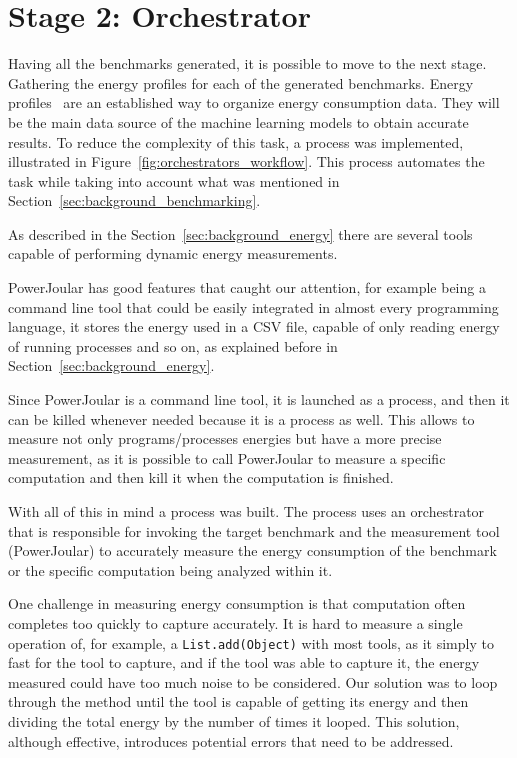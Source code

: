 

\section{Stage 2: Orchestrator} \label{sec:work_stage2_orchestrator}




Having all the benchmarks generated, it is possible to move to the next stage. Gathering the energy profiles for each of the generated benchmarks. 
Energy profiles~\cite{10.1145/2884781.2884869,8816747} are an established way to organize energy consumption data. They will be the main data source of the machine learning models to obtain accurate results. To reduce the complexity of this task, a process was implemented, illustrated in Figure~\ref{fig:orchestrators_workflow}. This process automates the task while taking into account what was mentioned in Section~\ref{sec:background_benchmarking}.

As described in the Section~\ref{sec:background_energy} there are several tools capable of performing dynamic energy measurements.

PowerJoular has good features that caught our attention, for example being a command line tool that could be easily integrated in almost every programming language, it stores the energy used in a CSV file, capable of only reading energy of running processes and so on, as explained before in Section~\ref{sec:background_energy}.

Since PowerJoular is a command line tool, it is launched as a process, and then it can be killed whenever needed because it is a process as well. This allows to measure not only programs/processes energies but have a more precise measurement, as it is possible to call PowerJoular to measure a specific computation and then kill it when the computation is finished.

With all of this in mind a process was built. The process uses an orchestrator that is responsible for invoking the target benchmark and the measurement tool (PowerJoular) to accurately measure the energy consumption of the benchmark or the specific computation being analyzed within it.


One challenge in measuring energy consumption is that computation often completes too quickly to capture accurately. It is hard to measure a single operation of, for example, a \texttt{List.\allowbreak add(Object)} with most tools, as it simply to fast for the tool to capture, and if the tool was able to capture it, the energy measured could have too much noise to be considered. Our solution was to loop through the method until the tool is capable of getting its energy and then dividing the total energy by the number of times it looped. 
This solution, although effective, introduces potential errors that need to be addressed.

